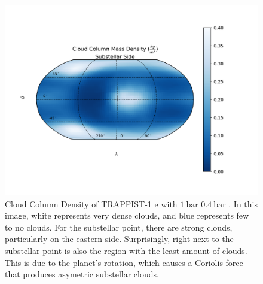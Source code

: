 \begin{figure}[htbp]
    \begin{center}
        \includegraphics[width=\textwidth]{models/cloud_map.png}
        \caption[Cloud Column Density of TRAPPIST-1 e]{Cloud Column Density of
        TRAPPIST-1 e with $\SI{1}{\bar}$  $\SI{0.4}{\bar}$
        . In this image,
        white represents very dense clouds, and blue represents few to no
        clouds. For the substellar point, there are strong clouds, particularly
        on the eastern side. Surprisingly, right next to the substellar point is
        also the region with the least amount of clouds. This is due to the
        planet's rotation, which causes a Coriolis force that produces asymetric
        substellar clouds.}
        \label{clouds}
    \end{center}
\end{figure}

